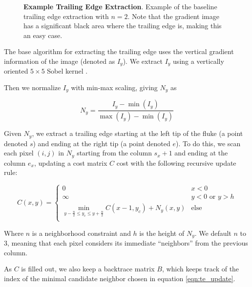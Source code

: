 \begin{figure}[t]%
\centering
{}
\newline
{}
\caption{\textbf{Example Trailing Edge Extraction}. Example of the baseline trailing edge extraction with $n = 2$. Note that the gradient image has a significant black area where the trailing edge is, making this an easy case.}
\label{fig:example_te_extract_noscorer}
\end{figure}

The base algorithm for extracting the trailing edge uses the vertical gradient information of the image (denoted as $I_y$).
We extract $I_y$ using a vertically oriented $5 \times 5$ Sobel kernel \cite{Sobel1968}.  

Then we normalize $I_y$ with min-max scaling, giving $N_y$ as

\begin{equation} \label{eqn:norm01}
N_{y} = \frac{I_y - \min(I_y)}{\max(I_y) - \min(I_y)}
\end{equation}

Given $N_y$, we extract a trailing edge starting at the left tip of the fluke (a point denoted $s$) and ending at the right tip (a point denoted $e$).
To do this, we scan each pixel $(i,j)$ in $N_y$ starting from the column $s_x + 1$ and ending at the column $e_x$, updating a cost matrix $C$ cost with the following recursive update rule:

\begin{equation} \label{eqn:te_update}
C(x,y) = 
\begin{cases}
	0 & x < 0 \\
	\infty & y < 0 \text{ or } y > h \\
	\min_{y - \frac{n}{2} \leq y_c \leq y + \frac{n}{2}}C(x-1, y_c) + N_y(x,y) & \text{else} \\
\end{cases}
\end{equation}

Where $n$ is a neighborhood constraint and $h$ is the height of $N_y$.  
We default $n$ to $3$, meaning that each pixel considers its immediate ``neighbors'' from the previous column.

As $C$ is filled out, we also keep a backtrace matrix $B$, which keeps track of the index of the minimal candidate neighbor chosen in equation \eqref{eqn:te_update}.

